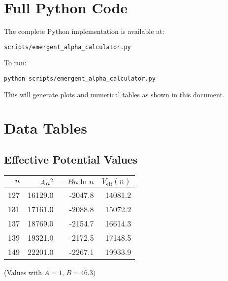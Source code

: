 \documentclass[12pt, a4paper]{article}
\begin{document}
\appendix

\section{Full Python Code}

The complete Python implementation is available at:
\begin{verbatim}
scripts/emergent_alpha_calculator.py
\end{verbatim}

To run:
\begin{verbatim}
python scripts/emergent_alpha_calculator.py
\end{verbatim}

This will generate plots and numerical tables as shown in this document.

\section{Data Tables}

\subsection{Effective Potential Values}

\begin{center}
\begin{tabular}{|r|r|r|r|}
\hline
$n$ & $An^2$ & $-Bn\ln n$ & $V_{\text{eff}}(n)$ \\
\hline
127 & 16129.0 & -2047.8 & 14081.2 \\
131 & 17161.0 & -2088.8 & 15072.2 \\
137 & 18769.0 & -2154.7 & 16614.3 \\
139 & 19321.0 & -2172.5 & 17148.5 \\
149 & 22201.0 & -2267.1 & 19933.9 \\
\hline
\end{tabular}
\end{center}

(Values with $A = 1$, $B = 46.3$)
\end{document}
